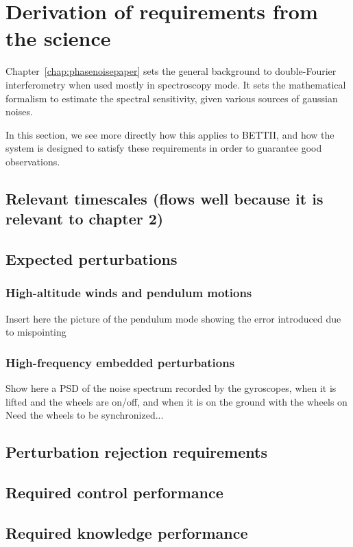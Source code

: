 \section{Derivation of requirements from the science}

Chapter~\ref{chap:phasenoisepaper} sets the general background to double-Fourier interferometry when used mostly in spectroscopy mode. It sets the mathematical formalism to estimate the spectral sensitivity, given various sources of gaussian noises. 

In this section, we see more directly how this applies to BETTII, and how the system is designed to satisfy these requirements in order to guarantee good observations.

\subsection{	Relevant timescales (flows well because it is relevant to chapter 2)}
\subsection{	Expected perturbations}
\subsubsection{	High-altitude winds and pendulum motions}
Insert here the picture of the pendulum mode showing the error introduced due to mispointing
\subsubsection{	High-frequency embedded perturbations}
Show here a PSD of the noise spectrum recorded by the gyroscopes, when it is lifted and the wheels are on/off, and when it is on the ground with the wheels on
Need the wheels to be synchronized...
\subsection{	Perturbation rejection requirements }
\subsection{	Required control performance}
\subsection{	Required knowledge performance}
